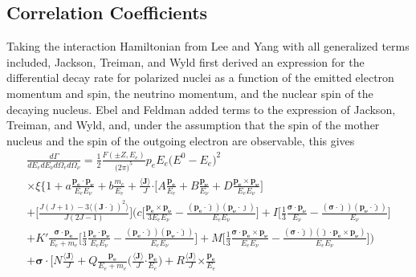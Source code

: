 \subsection{Correlation Coefficients} \label{ssec:correlations}
Taking the interaction Hamiltonian from Lee and Yang with all generalized terms included,
Jackson, Treiman, and Wyld \cite{jackson1957a,jackson1957b} first derived an expression
for the differential decay rate for polarized nuclei as a function of the emitted electron momentum
and spin, the neutrino momentum, and the nuclear spin of the decaying nucleus.
Ebel and Feldman \cite{ebel1957} added terms to the expression of Jackson, Treiman, and Wyld,
and, under the assumption that the spin of the mother nucleus and the spin of the outgoing electron
are observable, this gives
%
\begin{multline}
  \frac{d\Gamma}{dE_e dE_\nu d\Omega_e d\Omega_\nu} = \frac{1}{2} \frac{F(\pm Z, E_e)}{\big( 2\pi \big)^5}
  p_e E_e \big( E^0 - E_e \big)^2 \\ \times \xi 
  \Bigg\{ 1 + a\frac{\boldsymbol{p_e \cdot p_\nu}}{E_e E_\nu} + b\frac{m_e}{E_e} 
  + \frac{\boldsymbol{\langle J \rangle}}{J} \boldsymbol{\cdot} \Bigg[ A\frac{\boldsymbol{p_e}}{E_e}
    + B\frac{\boldsymbol{p_\nu}}{E_\nu} + D\frac{\boldsymbol{p_e \times p_\nu}}{E_e E_\nu}\Bigg] \\
  + \Bigg[ \frac{J(J+1)-3\langle (\boldsymbol{J \cdot \hat{\jmath}})^2 \rangle}{J(2J-1)} \Bigg]
  \Bigg( c\Bigg[ \frac{\boldsymbol{p_e} \times \boldsymbol{p_\nu}}{3E_eE_\nu} -
    \frac{(\boldsymbol{p_e\cdot \hat{\jmath}})(\boldsymbol{p_\nu\cdot \hat{\jmath}}) }{E_eE_\nu} \Bigg]
  + I \Bigg[ \frac{1}{3}\frac{\boldsymbol{\sigma \cdot p_\nu}}{E_\nu}
    - \frac{(\boldsymbol{\sigma \cdot \hat{\jmath}})(\boldsymbol{p_\nu \cdot \hat{\jmath}})}{E_\nu} \Bigg] \\
  + K'\frac{\boldsymbol{\sigma \cdot p_e}}{E_e+m_e} \Bigg[ \frac{1}{3}\frac{\boldsymbol{p_e \cdot p_\nu}}{E_e E_\nu}
    - \frac{(\boldsymbol{p_e \cdot \hat{\jmath}})(\boldsymbol{p_\nu \cdot \hat{\jmath}})}{E_e E_\nu} \Bigg] 
  + M \Bigg[ \frac{1}{3}\frac{\boldsymbol{\sigma \cdot p_e \times p_\nu}}{E_e E_\nu}
    - \frac{(\boldsymbol{\sigma \cdot \hat{\jmath}})(\boldsymbol{\hat{\jmath} \cdot p_e \times p_\nu })}{E_e E_\nu} \Bigg] \Bigg) \\
  + \boldsymbol{\sigma} \cdot \Bigg[ N\frac{\langle \boldsymbol{J} \rangle}{J}
    + Q\frac{\boldsymbol{p_e}}{E_e+m_e}\Bigg(\frac{\langle \boldsymbol{J} \rangle}{J}\boldsymbol{\cdot} \frac{\boldsymbol{p_e}}{E_e}\Bigg)
    + R\frac{\langle \boldsymbol{J} \rangle}{J}\boldsymbol{\times} \frac{\boldsymbol{p_e}}{E_e}

\end{multline}
